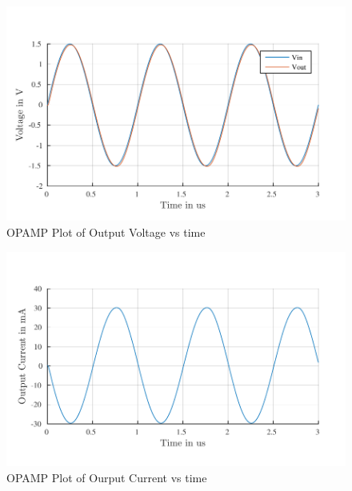 \begin{figure} [H]
\centering
\includegraphics[scale=1]{Figures/Plots/OPAMP_Buffer.pdf}
\caption{OPAMP Plot of Output Voltage vs time}
\end{figure}

\begin{figure} [H]
\centering
\includegraphics[scale=1]{Figures/Plots/OPAMP_Iout.pdf}
\caption{OPAMP Plot of Ourput Current vs time}
\end{figure}

